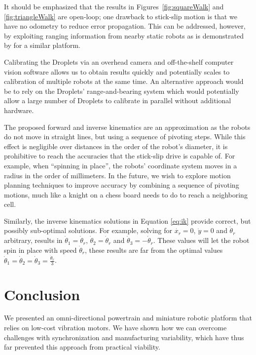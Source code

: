 \documentclass[letterpaper, 10pt, conference]{ieeeconf}
\begin{document}
It should be emphasized that the results in Figures~\ref{fig:squareWalk} and \ref{fig:triangleWalk} are open-loop; one drawback to stick-slip motion is that we have no odometry to reduce error propagation. This can be addressed, however, by exploiting ranging information from nearby static robots as is demonstrated by \cite{rubenstein2012kilobot} for a similar platform.

Calibrating the Droplets via an overhead camera and off-the-shelf computer vision software allows us to obtain results quickly and potentially scales to calibration of multiple robots at the same time. An alternative approach would be to rely on the Droplets' range-and-bearing system \cite{farrow14} which would potentially allow a large number of Droplets to calibrate in parallel without additional hardware. 

The proposed forward and inverse kinematics are an approximation as the robots do not move in straight lines, but using a sequence of pivoting steps. While this effect is negligible over distances in the order of the robot's diameter, it is prohibitive to reach the accuracies that the stick-slip drive is capable of. For example, when ``spinning in place'', the robots' coordinate system moves in a radius in the order of millimeters. In the future, we wish to explore motion planning techniques to improve accuracy by combining a sequence of pivoting motions, much like a knight on a chess board needs to do to reach a neighboring cell. 

Similarly, the inverse kinematics solutions in Equation \ref{eq:ik} provide correct, but possibly sub-optimal solutions. For example, solving for $\dot{x_r}=0$, $\dot{y}=0$ and $\dot{\theta}_r$ arbitrary, results in $\dot{\theta}_1=\dot{\theta}_r$, $\dot{\theta}_2=\dot{\theta}_r$ and $\dot{\theta}_3=-\dot{\theta}_r$. These values will let the robot spin in place with speed $\dot{\theta}_r$, these results are far from the optimal values $\dot{\theta}_1=\dot{\theta}_2=\dot{\theta}_3=\frac{\dot{\theta}_r}{3}$. 

\section{Conclusion}
We presented an omni-directional powertrain and miniature robotic platform that relies on low-cost vibration motors. We have shown how we can overcome challenges with synchronization and manufacturing variability, which have thus far prevented this approach from practical viability. 
\end{document}
